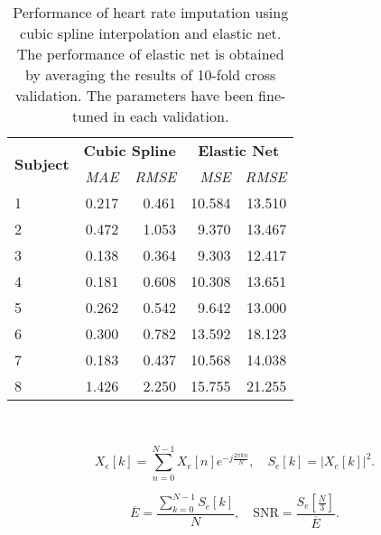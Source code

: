 \documentclass{sigchi}
\begin{document}
\begin{table*}[b]
\begin{table}[t]
    \centering
    \begin{tabular}{lrrrr}\toprule
        \multirow{2}{*}{\textbf{Subject}} & \multicolumn{2}{c}{\textbf{Cubic Spline}} & \multicolumn{2}{c}{\textbf{Elastic Net}}\\
        \cmidrule(r){2-3} \cmidrule(r){4-5}
        & \emph{MAE} & \emph{RMSE} & \emph{MSE} & \emph{RMSE}  \\ \midrule
        1 & 0.217 & 0.461 & 10.584 & 13.510 \\
        2 & 0.472 & 1.053 &  9.370 & 13.467 \\
        3 & 0.138 & 0.364 &  9.303 & 12.417 \\
        4 & 0.181 & 0.608 & 10.308 & 13.651 \\
        5 & 0.262 & 0.542 &  9.642 & 13.000 \\
        6 & 0.300 & 0.782 & 13.592 & 18.123 \\
        7 & 0.183 & 0.437 & 10.568 & 14.038 \\
        8 & 1.426 & 2.250 & 15.755 & 21.255 \\ \bottomrule
    \end{tabular}
    \caption{Performance of heart rate imputation using cubic spline interpolation and elastic net. The performance of elastic net is obtained by averaging the results of 10-fold cross validation. The parameters have been fine-tuned in each validation.}~\label{HRImputation}
\end{table}

\begin{equation}
    X_{e}[k] = \sum_{n = 0}^{N - 1}{X_{e}[n] e^{-j\frac{2\pi kn}{N}}} , \quad
    S_{e}[k] = |X_{e}[k]|^{2} .
\end{equation}

\begin{equation}
    \overline{E} = \frac{\sum_{k = 0}^{N - 1}{S_{e}[k]}}{N} ,\quad
    \text{SNR} = \frac{S_{e}[\frac{N}{3}]}{\overline{E}} .
\end{equation}

%
%
%
%
%


\end{table*}
\end{document}
